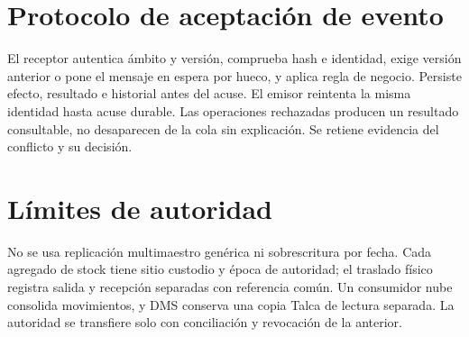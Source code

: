 \section*{Protocolo de aceptación de evento}
El receptor autentica ámbito y versión, comprueba hash e identidad, exige versión anterior o pone el mensaje en espera por hueco, y aplica regla de negocio. Persiste efecto, resultado e historial antes del acuse. El emisor reintenta la misma identidad hasta acuse durable. Las operaciones rechazadas producen un resultado consultable, no desaparecen de la cola sin explicación. Se retiene evidencia del conflicto y su decisión.

\section*{Límites de autoridad}
No se usa replicación multimaestro genérica ni sobrescritura por fecha. Cada agregado de stock tiene sitio custodio y época de autoridad; el traslado físico registra salida y recepción separadas con referencia común. Un consumidor nube consolida movimientos, y DMS conserva una copia Talca de lectura separada. La autoridad se transfiere solo con conciliación y revocación de la anterior.


